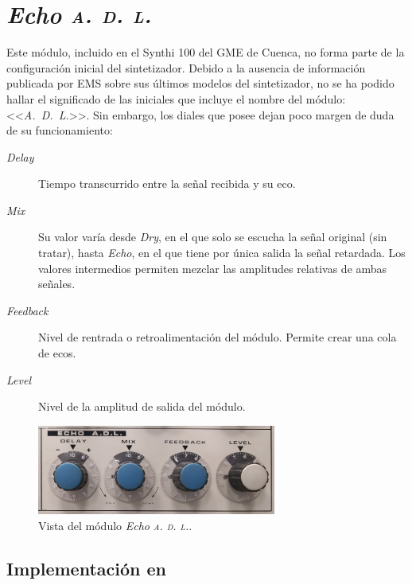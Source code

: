 \section{\textit{Echo \textsc{a. d. l.}}}
\label{sec:echo}

Este módulo, incluido en el Synthi 100 del GME de Cuenca, no forma parte de la configuración inicial del sintetizador. Debido a la ausencia de información publicada por EMS sobre sus últimos modelos del sintetizador, no se ha podido hallar el significado de las iniciales que incluye el nombre del módulo: <<\textit{A.~D.~L.}>>. Sin embargo, los diales que posee dejan poco margen de duda de su funcionamiento:

\begin{description}
	\item[\textit{Delay}] Tiempo transcurrido entre la señal recibida y su eco.
	\item[\textit{Mix}] Su valor varía desde \textit{Dry}, en el que solo se escucha la señal original (sin tratar), hasta \textit{Echo}, en el que tiene por única salida la señal retardada. Los valores intermedios permiten mezclar las amplitudes relativas de ambas señales.
	\item[\textit{Feedback}] Nivel de rentrada o retroalimentación del módulo. Permite crear una cola de ecos. 
	\item[\textit{Level}] Nivel de la amplitud de salida del módulo.
\end{description}

\begin{figure}
	\centering
	\includegraphics[width=0.7\textwidth]{images/echo}
	\caption[\textit{Echo \textsc{a. d. l.}}]{Vista del módulo \textit{Echo \textsc{a. d. l.}}.}
	\label{fig:echo}
\end{figure}

\subsection{Implementación en \appName}

